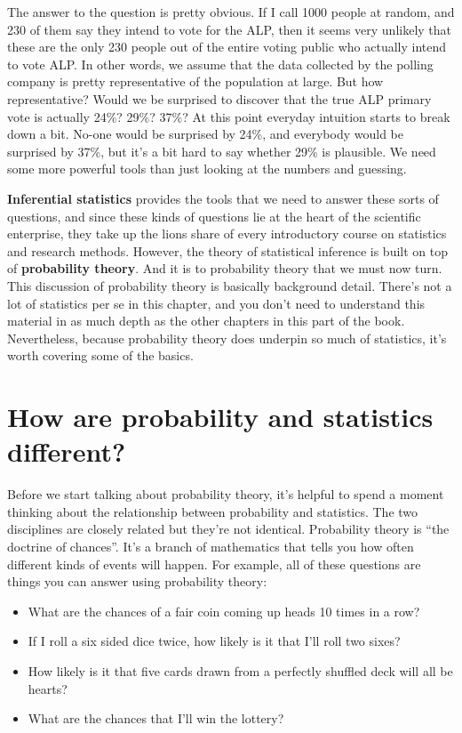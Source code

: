 \documentclass[
  letterpaper,
]{book}
\providecommand{\tightlist}{%
  \setlength{\itemsep}{0pt}\setlength{\parskip}{0pt}}\usepackage{longtable,booktabs,array}
\begin{document}
The answer to the question is pretty obvious. If I call 1000 people at
random, and 230 of them say they intend to vote for the ALP, then it
seems very unlikely that these are the only 230 people out of the entire
voting public who actually intend to vote ALP. In other words, we assume
that the data collected by the polling company is pretty representative
of the population at large. But how representative? Would we be
surprised to discover that the true ALP primary vote is actually 24\%?
29\%? 37\%? At this point everyday intuition starts to break down a bit.
No-one would be surprised by 24\%, and everybody would be surprised by
37\%, but it's a bit hard to say whether 29\% is plausible. We need some
more powerful tools than just looking at the numbers and guessing.

\textbf{Inferential statistics} provides the tools that we need to
answer these sorts of questions, and since these kinds of questions lie
at the heart of the scientific enterprise, they take up the lions share
of every introductory course on statistics and research methods.
However, the theory of statistical inference is built on top of
\textbf{probability theory}. And it is to probability theory that we
must now turn. This discussion of probability theory is basically
background detail. There's not a lot of statistics per se in this
chapter, and you don't need to understand this material in as much depth
as the other chapters in this part of the book. Nevertheless, because
probability theory does underpin so much of statistics, it's worth
covering some of the basics.

\hypertarget{how-are-probability-and-statistics-different}{%
\section{How are probability and statistics
different?}\label{how-are-probability-and-statistics-different}}

Before we start talking about probability theory, it's helpful to spend
a moment thinking about the relationship between probability and
statistics. The two disciplines are closely related but they're not
identical. Probability theory is ``the doctrine of chances''. It's a
branch of mathematics that tells you how often different kinds of events
will happen. For example, all of these questions are things you can
answer using probability theory:

\begin{itemize}
\tightlist
\item
  What are the chances of a fair coin coming up heads 10 times in a row?
\item
  If I roll a six sided dice twice, how likely is it that I'll roll two
  sixes?
\item
  How likely is it that five cards drawn from a perfectly shuffled deck
  will all be hearts?
\item
  What are the chances that I'll win the lottery?
\end{itemize}
\end{document}
